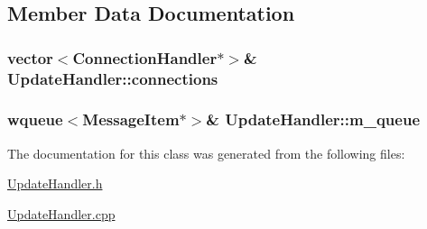 \subsection{Member Data Documentation}
\hypertarget{classUpdateHandler_ab4f5771a111b3b4e6db86d0a2d4e6a93}{
\subsubsection[{connections}]{\setlength{\rightskip}{0pt plus 5cm}vector$<${\bf Connection\+Handler}$\ast$$>$\& Update\+Handler\+::connections\hspace{0.3cm}{\ttfamily [private]}}}\label{classUpdateHandler_ab4f5771a111b3b4e6db86d0a2d4e6a93}
\hypertarget{classUpdateHandler_afb526d3bf849163a7028fc0759f3b2e6}{
\subsubsection[{m\+\_\+queue}]{\setlength{\rightskip}{0pt plus 5cm}wqueue$<${\bf Message\+Item}$\ast$$>$\& Update\+Handler\+::m\+\_\+queue\hspace{0.3cm}{\ttfamily [private]}}}\label{classUpdateHandler_afb526d3bf849163a7028fc0759f3b2e6}


The documentation for this class was generated from the following files\+:\begin{DoxyCompactItemize}
\item 
\hyperlink{UpdateHandler_8h}{Update\+Handler.\+h}\item 
\hyperlink{UpdateHandler_8cpp}{Update\+Handler.\+cpp}\end{DoxyCompactItemize}
